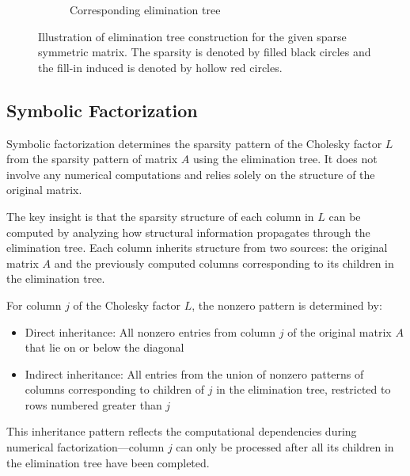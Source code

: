 \begin{figure}[H]
\begin{subfigure}[b]{0.45\textwidth}
        \caption{Corresponding elimination tree}
        \label{fig:etree-visualization}
    \end{subfigure}
    \caption{Illustration of elimination tree construction for the given sparse symmetric matrix. The sparsity is denoted by filled black circles and the fill-in induced is denoted by hollow red circles.}
    \label{fig:elimination-tree-example}
\end{figure}


\subsection{Symbolic Factorization}

Symbolic factorization determines the sparsity pattern of the Cholesky factor $L$ from the sparsity pattern of matrix $A$ using the elimination tree. It does not involve any numerical computations and relies solely on the structure of the original matrix.

The key insight is that the sparsity structure of each column in $L$ can be computed by analyzing how structural information propagates through the elimination tree. Each column inherits structure from two sources: the original matrix $A$ and the previously computed columns corresponding to its children in the elimination tree.

\begin{definition}
For column $j$ of the Cholesky factor $L$, the nonzero pattern is determined by:
\begin{itemize}
    \item Direct inheritance: All nonzero entries from column $j$ of the original matrix $A$ that lie on or below the diagonal
    \item Indirect inheritance: All entries from the union of nonzero patterns of columns corresponding to children of $j$ in the elimination tree, restricted to rows numbered greater than $j$
\end{itemize}
\end{definition}

This inheritance pattern reflects the computational dependencies during numerical factorization—column $j$ can only be processed after all its children in the elimination tree have been completed.

